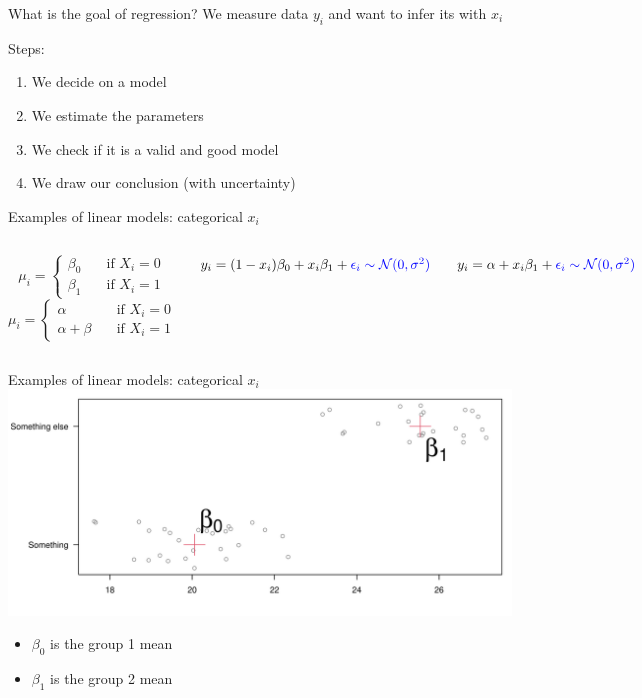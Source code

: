 \documentclass[
  ignorenonframetext,
]{beamer}
\providecommand{\tightlist}{%
  \setlength{\itemsep}{0pt}\setlength{\parskip}{0pt}}
\newcommand{\columnsbegin}{\begin{columns}}
\newcommand{\columnsend}{\end{columns}}
\begin{document}
\begin{frame}{What is the goal of regression?}
\label{what-is-the-goal-of-regression}
We measure data \(y_i\) and want to infer its with \(x_i\)

Steps:

\begin{enumerate}
[1)]
\tightlist
\item
  We decide on a model
\item
  We estimate the parameters
\item
  We check if it is a valid and good model
\item
  We draw our conclusion (with uncertainty)
\end{enumerate}
\end{frame}

\begin{frame}{Examples of linear models: categorical \(x_i\)}
\label{examples-of-linear-models-categorical-x_i}
\columnsbegin
{}

\[
\mu_i =
  \begin{cases}
    \beta_0       & \quad \text{if } X_i =0 \\
    \beta_1      & \quad \text{if } X_i =1  
  \end{cases}
\] \[
\mu_i =
  \begin{cases}
    \alpha       & \quad \text{if } X_i =0 \\
    \alpha + \beta       & \quad \text{if } X_i =1  
  \end{cases}
\] 

\(y_i = (1-x_i)\beta_0 + x_i\beta_1 + \textcolor{blue}{\epsilon_i\sim \mathcal{N}(0,\sigma^2)}\)

\vspace{2\baselineskip}

\(y_i = \alpha+ x_i\beta_1 + \textcolor{blue}{\epsilon_i\sim \mathcal{N}(0,\sigma^2)}\)

\columnsend
\end{frame}

\begin{frame}{Examples of linear models: categorical \(x_i\)}
\label{examples-of-linear-models-categorical-x_i-1}
\includegraphics{IntroLM_files/figure-beamer/unnamed-chunk-12-1.pdf}

\begin{itemize}
\tightlist
\item
  \(\beta_0\) is the group 1 mean
\item
  \(\beta_1\) is the group 2 mean
\end{itemize}
\end{frame}
\end{document}
